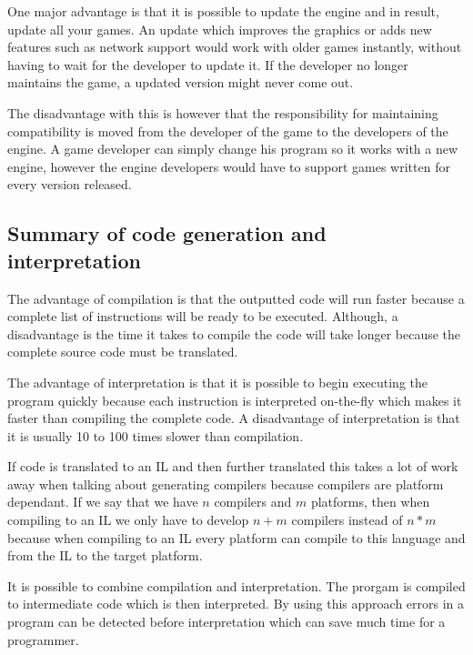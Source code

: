 One major advantage is that it is possible to update the engine and in result,
update all your games.  An update which improves the graphics or adds new
features such as network support would work with older games instantly, without
having to wait for the developer to update it.  If the developer no longer
maintains the game, a updated version might never come out.

The disadvantage with this is however that the responsibility for maintaining
compatibility is moved from the developer of the game to the developers of the
engine. A game developer can simply change his program so it works with a new
engine, however the engine developers would have to support games written for
every version released.

\subsection{Summary of code generation and interpretation}
The advantage of compilation is that the outputted code will run faster because 
a complete list of instructions will be ready to be executed. Although,
a disadvantage is the time it takes to compile the code will take longer because
the complete source code must be translated.

The advantage of interpretation is that it is possible to begin executing the
program quickly because each instruction is interpreted on-the-fly which makes
it faster than compiling the complete code. A disadvantage of interpretation is
that it is usually 10 to 100 times slower than compilation.

If code is translated to an IL and then further translated this takes a lot of
work away when talking about generating compilers because compilers are platform
dependant. If we say that we have $n$ compilers and $m$ platforms, then when
compiling to an IL we only have to develop $n+m$ compilers instead of $n*m$
because when compiling to an IL every platform can compile to this language and
from the IL to the target platform.

It is possible to combine compilation and interpretation. The prorgam is
compiled to intermediate code which is then interpreted. By using this approach
errors in a program can be detected before interpretation which can save much
time for a programmer.

